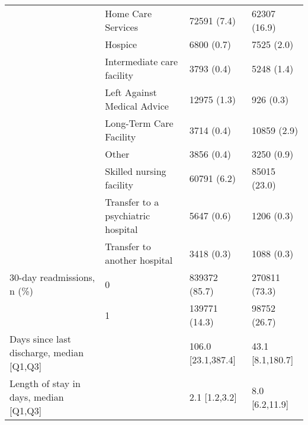 \begin{tabular}{llll}
                                       & Home Care Services &                           72591 (7.4) &      62307 (16.9) \\
                                       & Hospice &                            6800 (0.7) &        7525 (2.0) \\
                                       & Intermediate care facility &                            3793 (0.4) &        5248 (1.4) \\
                                       & Left Against Medical Advice &                           12975 (1.3) &         926 (0.3) \\
                                       & Long-Term Care Facility &                            3714 (0.4) &       10859 (2.9) \\
                                       & Other &                            3856 (0.4) &        3250 (0.9) \\
                                       & Skilled nursing facility &                           60791 (6.2) &      85015 (23.0) \\
                                       & Transfer to a psychiatric hospital &                            5647 (0.6) &        1206 (0.3) \\
                                       & Transfer to another hospital &                            3418 (0.3) &        1088 (0.3) \\
30-day readmissions, n (\%) & 0 &                         839372 (85.7) &     270811 (73.3) \\
                                       & 1 &                         139771 (14.3) &      98752 (26.7) \\
Days since last discharge, median [Q1,Q3] &   &                    106.0 [23.1,387.4] &  43.1 [8.1,180.7] \\
Length of stay in days, median [Q1,Q3] &   &                         2.1 [1.2,3.2] &    8.0 [6.2,11.9] \\
\bottomrule
\end{tabular}
